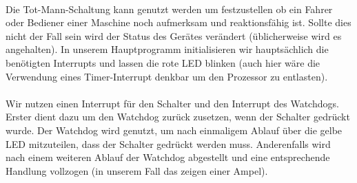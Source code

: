 \paragraph*{}
Die Tot-Mann-Schaltung kann genutzt werden um festzustellen ob ein Fahrer oder Bediener einer Maschine noch aufmerksam und reaktionsfähig ist. Sollte dies nicht der Fall sein wird der Status des Gerätes verändert (üblicherweise wird es angehalten). In unserem Hauptprogramm initialisieren wir hauptsächlich die benötigten Interrupts und lassen die rote LED blinken (auch hier wäre die Verwendung eines Timer-Interrupt denkbar um den Prozessor zu entlasten). \\ 



\paragraph*{}
Wir nutzen einen Interrupt für den Schalter und den Interrupt des Watchdogs. Erster dient dazu um den Watchdog zurück zusetzen, wenn der Schalter gedrückt wurde. Der Watchdog wird genutzt, um nach einmaligem Ablauf über die gelbe LED mitzuteilen, dass der Schalter gedrückt werden muss. Anderenfalls wird nach einem weiteren Ablauf der Watchdog abgestellt und eine entsprechende Handlung vollzogen (in unserem Fall das zeigen einer Ampel). \\ 


